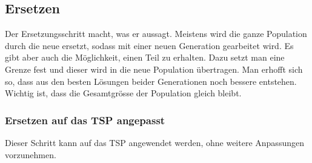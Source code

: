 %
%
%
%
\subsection{Ersetzen
\label{varalgbuch:paper:varalg:subsection:replacement}}
%
Der Ersetzungsschritt macht, was er aussagt. Meistens wird die ganze 
Population durch die neue ersetzt, sodass mit einer neuen Generation gearbeitet wird.
Es gibt aber auch die Möglichkeit, einen Teil zu erhalten. Dazu setzt man eine 
Grenze fest und dieser wird in die neue Population übertragen. Man erhofft sich so, 
dass aus den besten Lösungen beider Generationen noch bessere entstehen.
Wichtig ist, dass die Gesamtgrösse der Population gleich bleibt.

\subsubsection{Ersetzen auf das TSP angepasst
\label{buch:paper:varalg:subsection:replacement_tsp}}
Dieser Schritt kann auf das TSP angewendet werden, ohne weitere
Anpassungen vorzunehmen.
